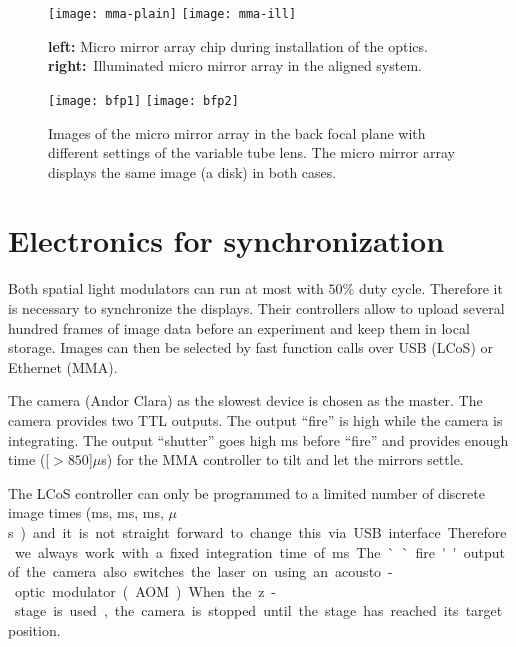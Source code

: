 \begin{figure}[!hbt]
  \centering
  \texttt{[image: mma-plain]}
  \texttt{[image: mma-ill]}
  \caption{{\bf left:} Micro mirror array chip during installation of
    the optics. {\bf right:}~Illuminated micro mirror array in the
    aligned system.}
  \label{fig:mma-closeup}
\end{figure}

\begin{figure}[!hbt]
  \centering
  \texttt{[image: bfp1]}
  \texttt{[image: bfp2]}
  \caption{Images of the micro mirror array in the back focal plane
    with different settings of the variable tube lens. The micro mirror
    array displays the same image (a disk) in both cases.}
  \label{fig:tubelens-bfp}
\end{figure}

\newpage
\section{Electronics for synchronization}
Both spatial light modulators can run at most with $50\%$ duty
cycle. Therefore it is necessary to synchronize the displays. Their
controllers allow to upload several hundred frames of image data
before an experiment and keep them in local storage. Images can then
be selected by fast function calls over USB (LCoS) or Ethernet (MMA).

The camera (Andor Clara) as the slowest device is chosen as the
master. The camera provides two TTL outputs. The output ``fire'' is
high while the camera is integrating. The output ``shutter'' goes high
\unit[1]{ms} before ``fire'' and provides enough time
(\unit[$>850$]{$\mu$s}) for the MMA controller to tilt and let the
mirrors settle.

The LCoS controller can only be programmed to a limited number of
discrete image times (\unit[20]{ms}, \unit[10]{ms}, \unit[5]{ms},
\unit[200]{$\mu$s}) and it is not straight forward to change this via
USB interface. Therefore we always work with a fixed integration time
of \unit[20]{ms}. The ``fire'' output of the camera also switches the
laser on using an acousto-optic modulator (AOM).

When the z-stage is used, the camera is stopped until the stage has
reached its target position.

